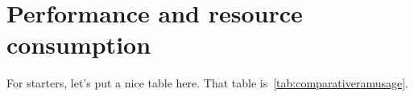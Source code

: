 \section{Performance and resource consumption}
\label{sec:comparativeperformance}

For starters, let's put a nice table here.
That table is~\ref{tab:comparativeramusage}.




